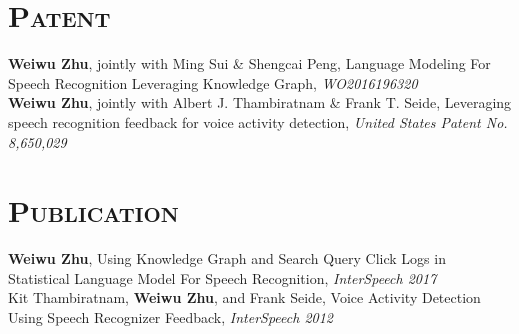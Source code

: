 \begin{resume}



\vspace*{-4pt}
\section{\textsc{Patent}}
\textbf{Weiwu Zhu}, jointly with Ming Sui \& Shengcai Peng, Language Modeling For Speech Recognition Leveraging Knowledge Graph, {\it WO2016196320}\\
\vspace*{-6pt}
\newline
\textbf{Weiwu Zhu}, jointly with Albert J. Thambiratnam \& Frank T. Seide, Leveraging speech recognition feedback for voice activity detection, {\it United States Patent No. 8,650,029}\\

\vspace*{-12pt}
\section{\textsc{Publication}}
\textbf{Weiwu Zhu}, Using Knowledge Graph and Search Query Click Logs in Statistical Language Model For Speech Recognition, {\it InterSpeech 2017}\\
\vspace*{-6pt}
\newline
Kit Thambiratnam, \textbf{Weiwu Zhu}, and Frank Seide, Voice Activity Detection Using Speech Recognizer Feedback, {\it InterSpeech 2012}\\





\end{resume}

